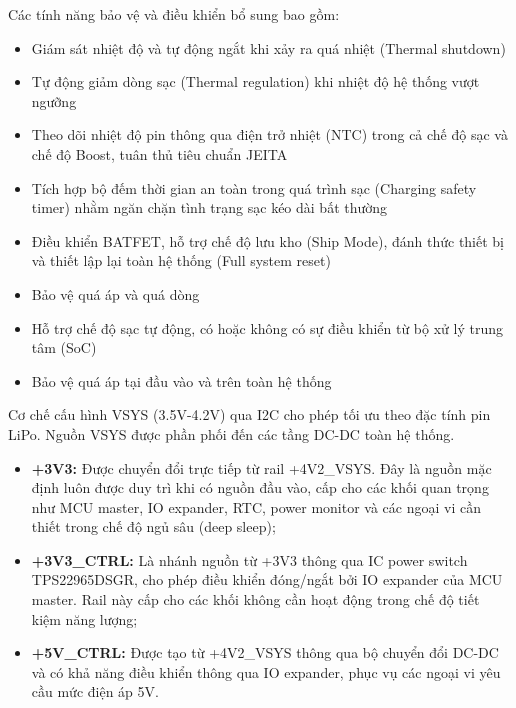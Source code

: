                     Các tính năng bảo vệ và điều khiển bổ sung bao gồm:
                    \begin{itemize}
                        \item Giám sát nhiệt độ và tự động ngắt khi xảy ra quá nhiệt (Thermal shutdown)
                        \item Tự động giảm dòng sạc (Thermal regulation) khi nhiệt độ hệ thống vượt ngưỡng
                        \item Theo dõi nhiệt độ pin thông qua điện trở nhiệt (NTC) trong cả chế độ sạc và chế độ Boost, tuân thủ tiêu chuẩn JEITA
                        \item Tích hợp bộ đếm thời gian an toàn trong quá trình sạc (Charging safety timer) nhằm ngăn chặn tình trạng sạc kéo dài bất thường
                        \item Điều khiển BATFET, hỗ trợ chế độ lưu kho (Ship Mode), đánh thức thiết bị và thiết lập lại toàn hệ thống (Full system reset)
                        \item Bảo vệ quá áp và quá dòng
                        \item Hỗ trợ chế độ sạc tự động, có hoặc không có sự điều khiển từ bộ xử lý trung tâm (SoC)
                        \item Bảo vệ quá áp tại đầu vào và trên toàn hệ thống
                    \end{itemize}
                    
                    Cơ chế cấu hình VSYS (3.5V-4.2V) qua I2C cho phép tối ưu theo đặc tính pin LiPo. Nguồn VSYS được phần phối đến các tầng DC-DC toàn hệ thống.
                    
                    \begin{itemize}
                        \item \textbf{+3V3:} Được chuyển đổi trực tiếp từ rail +4V2\_VSYS. Đây là nguồn mặc định luôn được duy trì khi có nguồn đầu vào, cấp cho các khối quan trọng như MCU master, IO expander, RTC, power monitor và các ngoại vi cần thiết trong chế độ ngủ sâu (deep sleep);
                        
                        \item \textbf{+3V3\_CTRL:} Là nhánh nguồn từ +3V3 thông qua IC power switch TPS22965DSGR, cho phép điều khiển đóng/ngắt bởi IO expander của MCU master. Rail này cấp cho các khối không cần hoạt động trong chế độ tiết kiệm năng lượng;
                        
                        \item \textbf{+5V\_CTRL:} Được tạo từ +4V2\_VSYS thông qua bộ chuyển đổi DC-DC và có khả năng điều khiển thông qua IO expander, phục vụ các ngoại vi yêu cầu mức điện áp 5V.
                    \end{itemize}
                    
